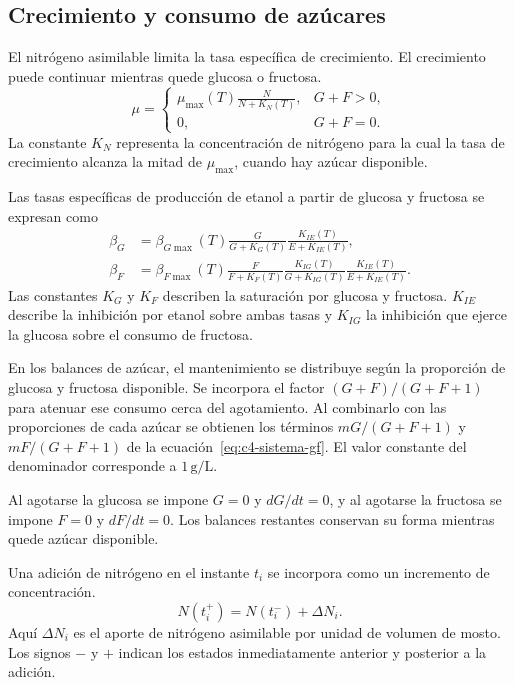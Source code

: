 \subsection{Crecimiento y consumo de az\'ucares}

El nitr\'ogeno asimilable limita la tasa espec\'ifica de
crecimiento. El crecimiento puede continuar mientras quede
glucosa o fructosa.
\begin{equation}
  \mu =
  \begin{cases}
    \displaystyle\mu_{\max}(T)\frac{N}{N+K_N(T)}, & G+F>0,\\[6pt]
    0, & G+F=0 .
  \end{cases}
  \label{eq:c4-crecimiento}
\end{equation}
La constante \(K_N\) representa la concentraci\'on de
nitr\'ogeno para la cual la tasa de crecimiento alcanza la mitad
de \(\mu_{\max}\), cuando hay az\'ucar disponible.

Las tasas espec\'ificas de producci\'on de etanol a partir de
glucosa y fructosa se expresan como
\begin{align}
  \beta_G &=
    \beta_{G\max}(T)\frac{G}{G+K_G(T)}
    \frac{K_{IE}(T)}{E+K_{IE}(T)}, \label{eq:c4-beta-g}\\[4pt]
  \beta_F &=
    \beta_{F\max}(T)\frac{F}{F+K_F(T)}
    \frac{K_{IG}(T)}{G+K_{IG}(T)}
    \frac{K_{IE}(T)}{E+K_{IE}(T)} .
    \label{eq:c4-beta-f}
\end{align}
Las constantes \(K_G\) y \(K_F\) describen la saturaci\'on por
glucosa y fructosa. \(K_{IE}\) describe la inhibici\'on por
etanol sobre ambas tasas y \(K_{IG}\) la inhibici\'on que ejerce
la glucosa sobre el consumo de fructosa.

En los balances de az\'ucar, el mantenimiento se distribuye
seg\'un la proporci\'on de glucosa y fructosa disponible.
Se incorpora el factor \((G+F)/(G+F+1)\) para atenuar ese consumo
cerca del agotamiento. Al combinarlo con las proporciones de cada
az\'ucar se obtienen los t\'erminos \(mG/(G+F+1)\) y
\(mF/(G+F+1)\) de la ecuaci\'on~\eqref{eq:c4-sistema-gf}.
El valor constante del denominador corresponde a
\(1\,\mathrm{g/L}\).

Al agotarse la glucosa se impone \(G=0\) y \(dG/dt=0\), y
al agotarse la fructosa se impone \(F=0\) y \(dF/dt=0\).
Los balances restantes conservan su forma mientras quede
az\'ucar disponible.

\begin{samepage}
Una adici\'on de nitr\'ogeno en el instante \(t_i\) se incorpora
como un incremento de concentraci\'on.
\begin{equation}
  N(t_i^+)=N(t_i^-)+\Delta N_i .
  \label{eq:c4-pulso-nitrogeno}
\end{equation}
Aqu\'i \(\Delta N_i\) es el aporte de nitr\'ogeno asimilable
por unidad de volumen de mosto. Los signos \(-\) y \(+\)
indican los estados inmediatamente anterior y posterior a la
adici\'on.
\end{samepage}

